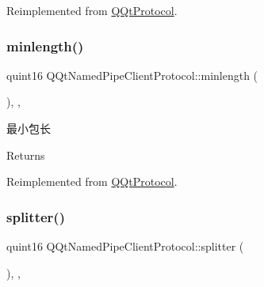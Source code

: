 Reimplemented from \mbox{\hyperlink{class_q_qt_protocol_af41bc3116abbbcfc9af45e151a253ff7}{Q\+Qt\+Protocol}}.

\mbox{\label{class_q_qt_named_pipe_client_protocol_a2575aa4579cdf49b29c3a830e83d90a1}} 
\subsubsection{\texorpdfstring{minlength()}{minlength()}}
{\footnotesize\ttfamily quint16 Q\+Qt\+Named\+Pipe\+Client\+Protocol\+::minlength (\begin{DoxyParamCaption}{ }\end{DoxyParamCaption})\hspace{0.3cm}{\ttfamily [override]}, {\ttfamily [protected]}, {\ttfamily [virtual]}}



最小包长 

\begin{DoxyReturn}{Returns}

\end{DoxyReturn}


Reimplemented from \mbox{\hyperlink{class_q_qt_protocol_a2b00f53d3dd0eed817eeecff422891f3}{Q\+Qt\+Protocol}}.

\mbox{\label{class_q_qt_named_pipe_client_protocol_a909aa772837f6ee556d59fb7fbdb3f37}} 
\subsubsection{\texorpdfstring{splitter()}{splitter()}}
{\footnotesize\ttfamily quint16 Q\+Qt\+Named\+Pipe\+Client\+Protocol\+::splitter (\begin{DoxyParamCaption}\item[{const Q\+Byte\+Array \&}]{ }\end{DoxyParamCaption})\hspace{0.3cm}{\ttfamily [override]}, {\ttfamily [protected]}, {\ttfamily [virtual]}}



